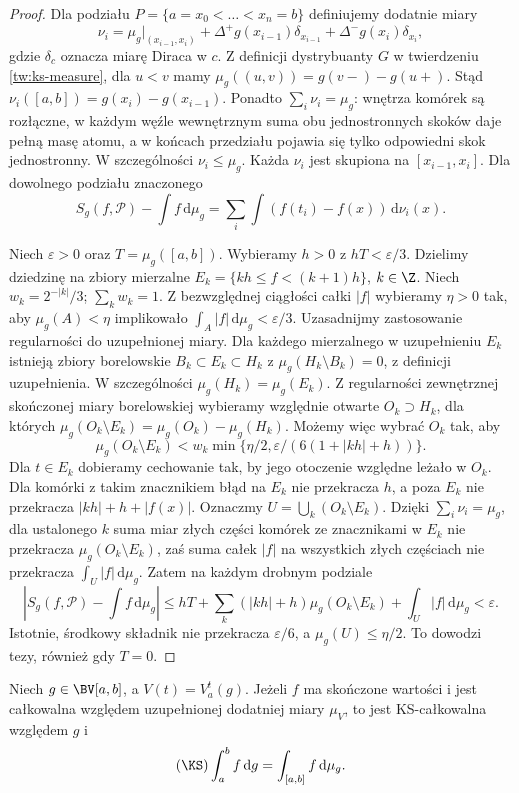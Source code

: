 \begin{proof}
Dla podziału $P=\{a=x_0<\dots<x_n=b\}$ definiujemy dodatnie miary
\[
 \nu_i=\mu_g|_{(x_{i-1},x_i)}
 +\Delta^+g(x_{i-1})\delta_{x_{i-1}}
 +\Delta^-g(x_i)\delta_{x_i},
\]
gdzie $\delta_c$ oznacza miarę Diraca w $c$. Z definicji dystrybuanty $G$ w twierdzeniu \ref{tw:ks-measure}, dla $u<v$ mamy
$\mu_g((u,v))=g(v-)-g(u+)$. Stąd $\nu_i([a,b])=g(x_i)-g(x_{i-1})$.
Ponadto $\sum_i\nu_i=\mu_g$: wnętrza komórek są rozłączne, w każdym węźle wewnętrznym suma obu jednostronnych skoków daje pełną masę atomu, a w końcach przedziału pojawia się tylko odpowiedni skok jednostronny. W szczególności $\nu_i\le\mu_g$. Każda $\nu_i$ jest skupiona na $[x_{i-1},x_i]$. Dla dowolnego podziału znaczonego
\[
 S_g(f,\mathcal P)-\int f\,\mathrm d\mu_g
 =\sum_i\int (f(t_i)-f(x))\,\mathrm d\nu_i(x).
\]

Niech $\varepsilon>0$ oraz $T=\mu_g([a,b])$. Wybieramy $h>0$ z $hT<\varepsilon/3$. Dzielimy dziedzinę na zbiory mierzalne $E_k=\{kh\le f<(k+1)h\}$, $k\in\Z$. Niech $w_k=2^{-|k|}/3$; $\sum_k w_k=1$. Z bezwzględnej ciągłości całki $|f|$ wybieramy $\eta>0$ tak, aby $\mu_g(A)<\eta$ implikowało $\int_A|f|\,\mathrm d\mu_g<\varepsilon/3$. Uzasadnijmy zastosowanie regularności do uzupełnionej miary. Dla każdego mierzalnego w uzupełnieniu $E_k$ istnieją zbiory borelowskie $B_k\subset E_k\subset H_k$ z $\mu_g(H_k\setminus B_k)=0$, z definicji uzupełnienia. W szczególności $\mu_g(H_k)=\mu_g(E_k)$. Z regularności zewnętrznej skończonej miary borelowskiej wybieramy względnie otwarte $O_k\supset H_k$, dla których $\mu_g(O_k\setminus E_k)=\mu_g(O_k)-\mu_g(H_k)$. Możemy więc wybrać $O_k$ tak, aby
\[
 \mu_g(O_k\setminus E_k)<w_k
 \min\{\eta/2,\varepsilon/(6(1+|kh|+h))\}.
\]
Dla $t\in E_k$ dobieramy cechowanie tak, by jego otoczenie względne leżało w $O_k$. Dla komórki z takim znacznikiem błąd na $E_k$ nie przekracza $h$, a poza $E_k$ nie przekracza $|kh|+h+|f(x)|$. Oznaczmy $U=\bigcup_k(O_k\setminus E_k)$. Dzięki $\sum_i\nu_i=\mu_g$, dla ustalonego $k$ suma miar złych części komórek ze znacznikami w $E_k$ nie przekracza $\mu_g(O_k\setminus E_k)$, zaś suma całek $|f|$ na wszystkich złych częściach nie przekracza $\int_U|f|\,\mathrm d\mu_g$. Zatem na każdym drobnym podziale
\[
 |S_g(f,\mathcal P)-\int f\,\mathrm d\mu_g|
 \le hT+\sum_k(|kh|+h)\mu_g(O_k\setminus E_k)
     +\int_U|f|\,\mathrm d\mu_g<\varepsilon.
\]
Istotnie, środkowy składnik nie przekracza $\varepsilon/6$, a $\mu_g(U)\le\eta/2$. To dowodzi tezy, również gdy $T=0$.
\end{proof}
\begin{wniosek}\label{ma1:kh:cor:ks-variation-measure-l1}
Niech $g\in\BV[a,b]$, a $V(t)=V_a^t(g)$. Jeżeli $f$ ma skończone wartości i jest całkowalna względem uzupełnionej dodatniej miary $\mu_V$, to jest KS-całkowalna względem $g$ i
\[
 (\KS)\int_a^b f\,\mathrm dg=\int_{[a,b]}f\,\mathrm d\mu_g.
\]
\end{wniosek}
